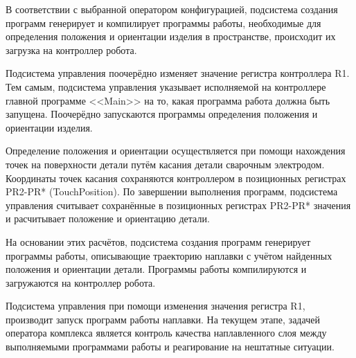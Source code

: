 В соответствии с выбранной оператором конфигурацией, подсистема создания программ генерирует и компилирует программы работы, необходимые для определения положения и ориентации изделия в пространстве, происходит их загрузка на контроллер робота.

Подсистема управления поочерёдно изменяет значение регистра контроллера R1.
Тем самым, подсистема управления указывает исполняемой на контроллере главной программе <<Main>> на то, какая программа работа должна быть запущена.
Поочерёдно запускаются программы определения положения и ориентации изделия.

Определение положения и ориентации осуществляется при помощи нахождения точек на поверхности детали путём касания детали сварочным электродом.
Координаты точек касания сохраняются контроллером в позиционных регистрах PR2-PR* (TouchPosition).
По завершении выполнения программ, подсистема управления считывает сохранённые в позиционных регистрах PR2-PR* значения и расчитывает положение и ориентацию детали.

На основании этих расчётов, подсистема создания программ генерирует программы работы, описывающие траекторию наплавки с учётом найденных положения и ориентации детали.
Программы работы компилируются и загружаются на контроллер робота.

Подсистема управления при помощи изменения значения регистра R1, производит запуск программ работы наплавки.
На текущем этапе, задачей оператора комплекса является контроль качества наплавленного слоя между выполняемыми программами работы и реагирование на нештатные ситуации.
